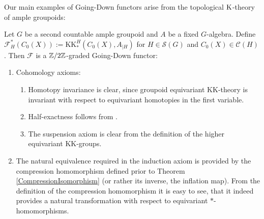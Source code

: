 	Our main examples of Going-Down functors arise from the topological $\mathrm K$-theory of ample groupoids:
	\begin{ex}\label{Example:Going-Down functor}
		Let $G$ be a second countable ample groupoid and $A$ be a fixed $G$-algebra. Define $\mathcal{F}_H^*(C_0(X)):=\mathrm{KK}^H_*(C_0(X),A_{\mid H})$ for $H\in\mathcal{S}(G)$ and $C_0(X)\in\mathcal{C}(H)$. Then $\mathcal{F}$ is a $\mathbb Z/2\mathbb Z$-graded Going-Down functor:
		\begin{enumerate}
			\item Cohomology axioms:
			\begin{enumerate}
				\item Homotopy invariance is clear, since groupoid equivariant $\mathrm{KK}$-theory is invariant with respect to equivariant homotopies in the first variable.
				\item Half-exactness follows from \cite[Proposition~7.2 and Lemma~7.7]{Tu99}.
				\item The suspension axiom is clear from the definition of the higher equivariant $\mathrm{KK}$-groups.
			\end{enumerate}
			\item The natural equivalence required in the induction axiom is provided by the compression homomorphism defined prior to Theorem \ref{CompressionIsomorphism} (or rather its inverse, the inflation map). From the definition of the compression homomorphism it is easy to see, that it indeed provides a natural transformation with respect to equivariant $\ast$-homomorphisms.
		\end{enumerate}
	\end{ex}
	
